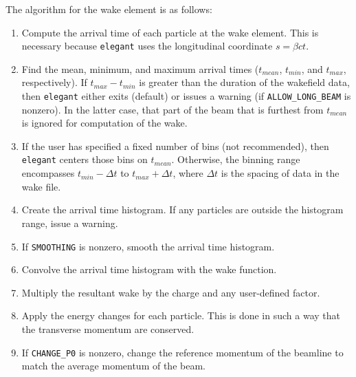 The algorithm for the wake element is as follows:
\begin{enumerate}
\item Compute the arrival time of each particle at the wake element. This
 is necessary because {\tt elegant} uses the longitudinal coordinate $s=\beta c t$.
\item Find the mean, minimum, and maximum arrival times ($t_{mean}$, $t_{min}$, and
 $t_{max}$, respectively).  If $t_{max}-t_{min}$ is greater than the duration of 
 the wakefield data, then {\tt elegant} either exits (default) or issues a warning (if 
 \verb|ALLOW_LONG_BEAM| is nonzero).  In the latter case, that part of the beam that
 is furthest from $t_{mean}$ is ignored for computation of the wake.
\item If the user has specified a fixed number of bins (not recommended), then {\tt elegant}
 centers those bins on $t_{mean}$.  Otherwise, the binning range encompasses $t_{min}-\Delta t$
 to $t_{max}+\Delta t$, where $\Delta t$ is the spacing of data in the wake file.
\item Create the arrival time histogram.  If any particles are outside the histogram range,
 issue a warning.
\item If \verb|SMOOTHING| is nonzero, smooth the arrival time histogram.
\item Convolve the arrival time histogram with the wake function.
\item Multiply the resultant wake by the charge and any user-defined factor.
\item Apply the energy changes for each particle.  This is done in such a way that
 the transverse momentum are conserved.
\item If \verb|CHANGE_P0| is nonzero, change the reference momentum of the beamline to 
 match the average momentum of the beam.
\end{enumerate}


